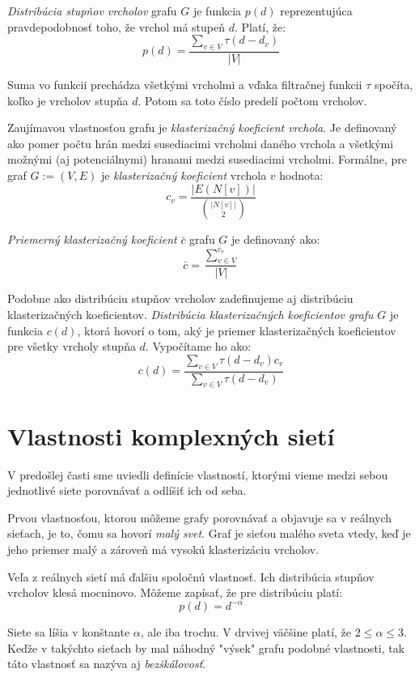 \emph{Distribúcia stupňov vrcholov} grafu $G$ je funkcia 
$p(d)$ reprezentujúca pravdepodobnosť toho, že vrchol má stupeň $d$. Platí, že: 
$$p(d) = \frac{\sum_{v \in V}^{}{\tau(d - d_v)}}{|V|}$$

Suma vo funkcii prechádza všetkými vrcholmi a vďaka filtračnej funkcii $\tau$ 
spočíta, koľko je vrcholov stupňa $d$. Potom sa toto číslo predelí počtom vrcholov.

Zaujímavou vlastnosťou grafu je \emph{klasterizačný koeficient vrchola}. Je 
definovaný ako pomer počtu hrán medzi susediacimi vrcholmi daného vrchola a 
všetkými možnými (aj potenciálnymi) hranami medzi susediacimi vrcholmi. 
Formálne, pre graf $G := (V, E)$ je \emph{klasterizačný koeficient} vrchola 
$v$ hodnota: $$c_v = \frac{|E(N[v])|}{\binom{|N[v]|}{2}}$$

\emph{Priemerný klasterizačný koeficient} $\bar{c}$ grafu $G$ je definovaný ako:
$$\bar{c} = \frac{\sum_{v\in V}^{c_v}}{|V|}$$

Podobne ako distribúciu stupňov vrcholov zadefinujeme aj distribúciu 
klasterizačných koeficientov. \emph{Distribúcia klasterizačných koeficientov 
grafu} $G$ je funkcia $c(d)$, ktorá hovorí o tom, aký je priemer
klasterizačných koeficientov pre všetky vrcholy stupňa $d$. Vypočítame ho ako: 
$$c(d) = \frac{\sum_{v \in V}^{}{\tau(d - d_v)c_v}}
{\sum_{v \in V}^{}{\tau(d - d_v)}}$$

\section{Vlastnosti komplexných sietí}

V predošlej časti sme uviedli definície vlastností, ktorými vieme medzi sebou 
jednotlivé siete porovnávať a odlíšiť ich od seba.

Prvou vlastnosťou, ktorou môžeme grafy porovnávať a objavuje sa v reálnych 
sieťach, je to, čomu sa hovorí \emph{malý svet}. Graf je sieťou malého sveta 
vtedy, keď je jeho priemer malý a zároveň má vysokú klasterizáciu vrcholov.

Veľa z reálnych sietí má ďalšiu spoločnú vlastnosť. Ich distribúcia stupňov 
vrcholov klesá mocninovo. Môžeme zapísať, že pre distribúciu platí:
$$p(d) = d^{-\alpha}$$

Siete sa líšia v konštante $\alpha$, ale iba trochu. V drvivej väčšine platí, 
že $2 \leq \alpha \leq 3$. Keďže v takýchto sieťach by mal náhodný "výsek" 
grafu podobné vlastnosti, tak táto vlastnosť sa nazýva aj \emph{bezškálovosť}.

